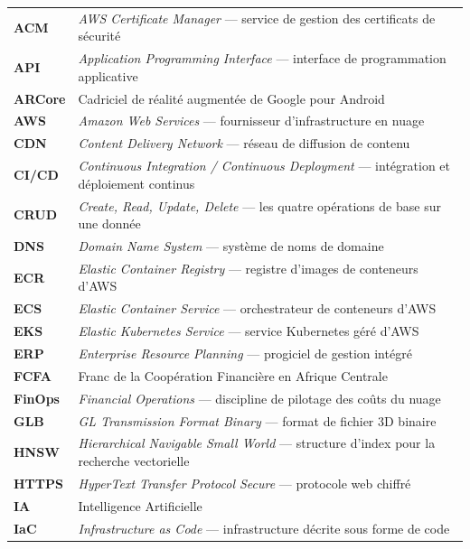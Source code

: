 \begingroup
{}
\small
\begin{longtable}{@{}L{2.6cm}@{\hspace{0.6em}}L{11.6cm}@{}}
\textbf{ACM}      & \emph{AWS Certificate Manager} — service de gestion des certificats de sécurité \\
\textbf{API}      & \emph{Application Programming Interface} — interface de programmation applicative \\
\textbf{ARCore}   & Cadriciel de réalité augmentée de Google pour Android \\
\textbf{AWS}      & \emph{Amazon Web Services} — fournisseur d'infrastructure en nuage \\
\textbf{CDN}      & \emph{Content Delivery Network} — réseau de diffusion de contenu \\
\textbf{CI/CD}    & \emph{Continuous Integration / Continuous Deployment} — intégration et déploiement continus \\
\textbf{CRUD}     & \emph{Create, Read, Update, Delete} — les quatre opérations de base sur une donnée \\
\textbf{DNS}      & \emph{Domain Name System} — système de noms de domaine \\
\textbf{ECR}      & \emph{Elastic Container Registry} — registre d'images de conteneurs d'AWS \\
\textbf{ECS}      & \emph{Elastic Container Service} — orchestrateur de conteneurs d'AWS \\
\textbf{EKS}      & \emph{Elastic Kubernetes Service} — service Kubernetes géré d'AWS \\
\textbf{ERP}      & \emph{Enterprise Resource Planning} — progiciel de gestion intégré \\
\textbf{FCFA}     & Franc de la Coopération Financière en Afrique Centrale \\
\textbf{FinOps}   & \emph{Financial Operations} — discipline de pilotage des coûts du nuage \\
\textbf{GLB}      & \emph{GL Transmission Format Binary} — format de fichier 3D binaire \\
\textbf{HNSW}     & \emph{Hierarchical Navigable Small World} — structure d'index pour la recherche vectorielle \\
\textbf{HTTPS}    & \emph{HyperText Transfer Protocol Secure} — protocole web chiffré \\
\textbf{IA}       & Intelligence Artificielle \\
\textbf{IaC}      & \emph{Infrastructure as Code} — infrastructure décrite sous forme de code \\

\end{longtable}
